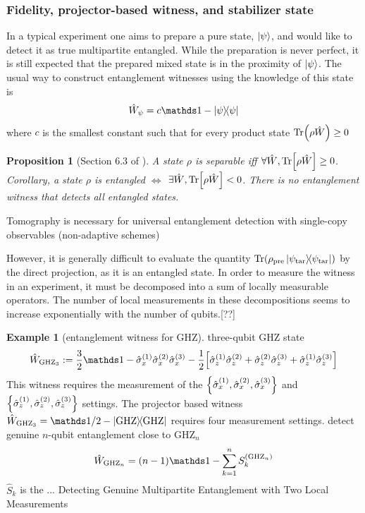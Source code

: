 \documentclass[
10pt,
aps,
pra,
linenumbers,
floatfix,
]{revtex4-2}
\theoremstyle{plain}
\newtheorem{proposition}{Proposition}
\newtheorem{question}{Question}
\theoremstyle{definition}
\newtheorem{example}{Example}
\newtheorem{remark}{Remark}
\newcommand{\ew}{\hat{W}}
\newcommand{\ghz}{\text{GHZ}}
\newcommand{\target}{\textup{tar}}
\newcommand{\prepare}{\textup{pre}}
\newcommand{\stbz}{\hat{S}}
\newcommand{\dm}{\rho}
\begin{document}
\subsubsection{Fidelity, projector-based witness, and stabilizer state}
In a typical experiment one aims to prepare a pure state, $\ket{\psi}$, and would like to detect it as true multipartite entangled. 
While the preparation is never perfect, it is still expected that the prepared mixed state is in the proximity of $\ket{\psi}$. The usual way to construct entanglement witnesses using the knowledge of this state is
\begin{equation}
	\ew_{\psi} = c\identity - \op{\psi} 
	\label{eq:entanglement_witness}
\end{equation}
where $c$ is the smallest constant such that for every product state $\Tr(\dm\ew)\ge 0$
\begin{proposition}[Section 6.3 of \cite{heinosaariMathematicalLanguageQuantum2011}]
	A state $\dm$ is separable iff $\forall \ew,\Tr[\dm \ew]\ge 0$. 
	Corollary, a state $\dm$ is entangled $\iff$  $\exists \ew,\Tr[\dm \ew]<0$. 
	There is no entanglement witness that detects all entangled states.
\end{proposition}
Tomography is necessary for universal entanglement detection with single-copy observables (non-adaptive schemes)
\cite{luTomographyNecessaryUniversal2016}

However, it is generally difficult to evaluate the quantity $\Tr(\dm_{\prepare} \op{\psi_{\target}})$ by the direct projection, as it is an entangled state.
In order to measure the witness in an experiment, it must be decomposed into a sum of locally measurable operators. The number of local measurements in these decompositions seems to increase exponentially with the number of qubits.[??]
\begin{example}[entanglement witness for GHZ]
	three-qubit GHZ state 
	\cite{tothDetectingGenuineMultipartite2005}
	\begin{equation}
		\ew_{\ghz_3} := \frac{3}{2} \identity - \sx^{(1)}\sx^{(2)}\sx^{(3)}
		- \frac{1}{2} \qty[
			\sz^{(1)} \sz^{(2)} + 
			\sz^{(2)} \sz^{(3)} + 
			\sz^{(1)} \sz^{(3)} 
		]
	\end{equation}
	This witness requires the measurement of the $\qty{\hat{\sigma}_x^{(1)},\hat{\sigma}_x^{(2)},\hat{\sigma}_x^{(3)}}$ and $\qty{\hat{\sigma}_z^{(1)},\hat{\sigma}_z^{(2)},\hat{\sigma}_z^{(3)}}$ settings.
	The projector based witness $\ew_{\ghz_3}=\identity/2 - \op{\ghz}$ requires four measurement settings.
	detect genuine $n$-qubit entanglement close to $\ghz_n$
	\begin{equation}
		\ew_{\ghz_n} = (n-1) \identity - \sum_{k=1}^n S_k^{(\ghz_n)}
	\end{equation}
	$\stbz_k$ is the  ... \cite{tothEntanglementDetectionStabilizer2005}
	Detecting Genuine Multipartite Entanglement with Two Local Measurements \cite{tothDetectingGenuineMultipartite2005}
\end{example}
\end{document}

